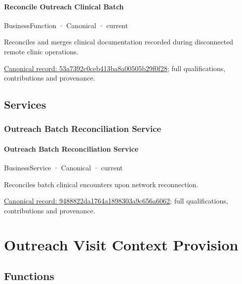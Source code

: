 \paragraph{Reconcile Outreach Clinical Batch}

\label{element:53a7392c0ceb413ba8a00505b29f0f28}
{\small BusinessFunction · Canonical · current}\par

Reconciles and merges clinical documentation recorded during disconnected remote clinic operations.


{\footnotesize \href{../../../../continuum/business/business-function/53a7392c0ceb413ba8a00505b29f0f28.md}{Canonical record: 53a7392c0ceb413ba8a00505b29f0f28}; full qualifications, contributions and provenance.}\par
\subsection{Services}

\subsubsection{Outreach Batch Reconciliation Service}

\paragraph{Outreach Batch Reconciliation Service}

\label{element:9488822da1764a1898303a9c656a6062}
{\small BusinessService · Canonical · current}\par

Reconciles batch clinical encounters upon network reconnection.


{\footnotesize \href{../../../../continuum/business/business-service/9488822da1764a1898303a9c656a6062.md}{Canonical record: 9488822da1764a1898303a9c656a6062}; full qualifications, contributions and provenance.}\par
\section{Outreach Visit Context Provision}

\subsection{Functions}

